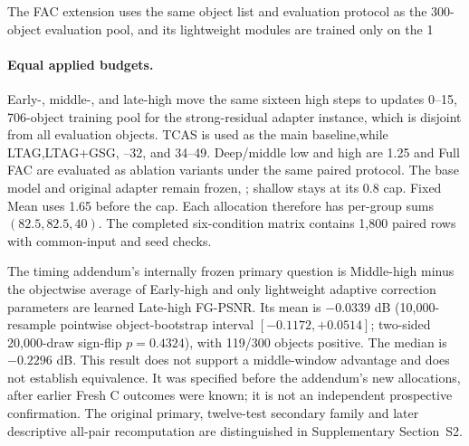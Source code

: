 \documentclass[times,twocolumn,final]{elsarticle}
\providecommand{\DIFadd}[1]{{\protect\color{blue} \sf #1}} %
\providecommand{\DIFdel}[1]{{\protect\color{red} \scriptsize #1}} %
\providecommand{\DIFaddbegin}{} %
\providecommand{\DIFaddend}{} %
\providecommand{\DIFdelbegin}{} %
\providecommand{\DIFdelend}{} %
\begin{document}
\DIFdelbegin \DIFdel{The FAC extension uses the same object list and evaluation protocol as the 300-object evaluation pool, and its lightweight modules are trained only on the 1}\DIFdelend \DIFaddbegin \paragraph{Equal applied budgets.}
\label{subsec:matched-budget300}
\DIFadd{Early-, middle-, and late-high move the same sixteen high steps to updates 0--15}\DIFaddend , \DIFdelbegin \DIFdel{706-object training pool for the strong-residual adapter instance, which is disjoint from all evaluation objects.
TCAS is used as the main baseline,while LTAG,LTAG+GSG, }\DIFdelend \DIFaddbegin \DIFadd{17--32, and 34--49. Deep/middle low and high are 1.25 }\DIFaddend and \DIFdelbegin \DIFdel{Full FAC are evaluated as ablation variants under the same paired protocol. The base model and original adapter remain frozen, }\DIFdelend \DIFaddbegin \DIFadd{2.50; shallow stays at its 0.8 cap. Fixed Mean uses 1.65 before the cap. Each allocation therefore has per-group sums $(82.5,82.5,40)$. The completed six-condition matrix contains 1,800 paired rows with common-input and seed checks.
}

\DIFadd{The timing addendum's internally frozen primary question is Middle-high minus the objectwise average of Early-high }\DIFaddend and \DIFdelbegin \DIFdel{only lightweight adaptive correction parameters are learned}\DIFdelend \DIFaddbegin \DIFadd{Late-high FG-PSNR. Its mean is $-0.0339$ dB (10,000-resample pointwise object-bootstrap interval $[-0.1172,+0.0514]$; two-sided 20,000-draw sign-flip $p=0.4324$), with 119/300 objects positive. The median is $-0.2296$ dB. This result does not support a middle-window advantage and does not establish equivalence. It was specified before the addendum's new allocations, after earlier Fresh C outcomes were known; it is not an independent prospective confirmation. The original primary, twelve-test secondary family and later descriptive all-pair recomputation are distinguished in Supplementary Section~S2}\DIFaddend .

\DIFdelbegin %
\end{document}
